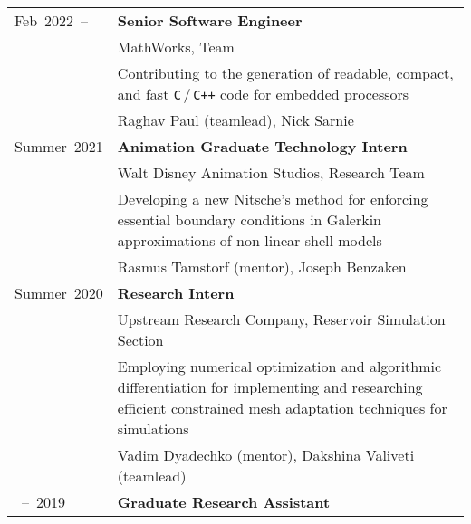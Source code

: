 \documentclass[a4paper,12pt]{article}
\makeatletter
\newcommand{\myuline}[1]{%
	\uline{\phantom{#1}}%
	\llap{\contour{bgclr}{#1}}%
}
\newcommand\xhref[2]{\href{#1}{\myuline{#2}}}
\newcommand\myrefs{\multicolumn{1}{r}{\color{minorclr}References:}}
\newcommand\at{\multicolumn{1}{r}{\color{minorclr}@}}
\makeatother
\begin{document}
	\begin{longtable}{>{\raggedright\arraybackslash}p{2.5cm}>{\raggedright\arraybackslash}p{14.6cm}}
		Feb~2022~--
			& \textbf{Senior Software Engineer}\vspace{2mm}\\
			\at & MathWorks, \xhref{https://www.mathworks.com/products/embedded-coder.html}{Embedded Coder} Team\vspace{2mm}\\
			& Contributing to the generation of readable, compact, and fast \texttt{C}\,/\,\texttt{C++} code for embedded processors\vspace{2mm}\\
			\myrefs & Raghav Paul (teamlead), Nick Sarnie\vspace{4mm}\\
		Summer~2021
			& \textbf{Animation Graduate Technology Intern}\vspace{2mm}\\
			\at & Walt Disney Animation Studios, \xhref{https://www.disneyanimation.com/technology/}{WDAS Technology} Research Team\vspace{2mm}\\
			& Developing a new Nitsche's method for enforcing essential boundary conditions in Galerkin approximations of non-linear shell models\vspace{2mm}\\
			\myrefs & Rasmus Tamstorf (mentor), Joseph Benzaken\vspace{4mm}\\
		Summer~2020
			& \textbf{Research Intern}\vspace{2mm}\\
			\at & \xhref{https://corporate.exxonmobil.com/}{ExxonMobil} Upstream Research Company, Reservoir Simulation Section\vspace{2mm}\\
			& Employing numerical optimization and algorithmic differentiation for implementing and researching efficient constrained mesh adaptation techniques for \xhref{https://en.wikipedia.org/wiki/Hydraulic_fracturing}{hydrofrac} simulations\vspace{2mm}\\
			\myrefs & Vadim Dyadechko (mentor), Dakshina Valiveti (teamlead) \vspace{4mm}\\			
		2018~--~2019
			& \textbf{Graduate Research Assistant}\vspace{2mm}\\

\end{longtable}
\end{document}
